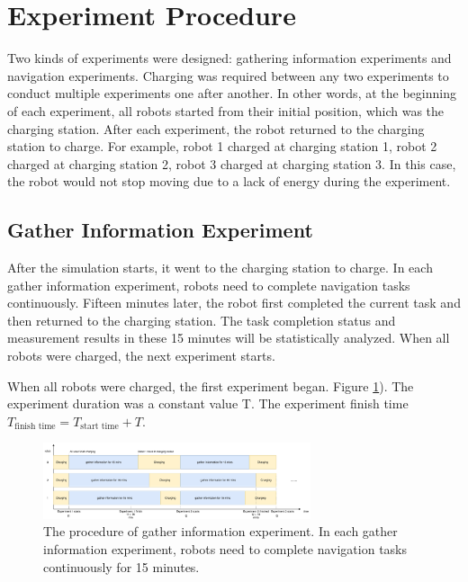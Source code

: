 \section{Experiment Procedure}
Two kinds of experiments were designed: gathering information experiments and navigation experiments. Charging was required between any two experiments to conduct multiple experiments one after another. In other words, at the beginning of each experiment, all robots started from their initial position, which was the charging station. After each experiment, the robot returned to the charging station to charge. For example, robot 1 charged at charging station 1, robot 2 charged at charging station 2, robot 3 charged at charging station 3. In this case, the robot would not stop moving due to a lack of energy during the experiment. 


\subsection{Gather Information Experiment}
After the simulation starts, it went to the charging station to charge. In each gather information experiment, robots need to complete navigation tasks continuously. Fifteen minutes later, the robot first completed the current task and then returned to the charging station. The task completion status and measurement results in these 15 minutes will be statistically analyzed. When all robots were charged, the next experiment starts.

When all robots were charged, the first experiment began. Figure \ref{fig:env_exp_timeline}). The experiment duration was a constant value T. The experiment finish time $T_{\mbox{finish time}} = T_{\mbox{start time}} + T $. 

\begin{figure}[htbp]
\centering
\includegraphics[width = 0.7\textwidth]{content/images/ch5/env_exp_timeline.drawio.png}
\caption{The procedure of gather information experiment.  In each gather information experiment, robots need to complete navigation tasks continuously for 15 minutes.}
\label{fig:env_exp_timeline}
\end{figure}


